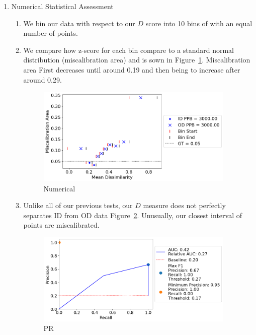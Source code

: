 \begin{enumerate}
    \item Numerical Statistical Assessment
    
    \begin{enumerate}
        \item We bin our data with respect to our $D$ score into 10 bins of with an equal number of points.

        \item We compare how z-score for each bin compare to a standard normal distribution (miscalibration area) and is sown in Figure~\ref{friedman_stat}. Miscalibration area First decreases until around 0.19 and then being to increase after around 0.29. 

        \begin{figure}[H]
        \centering
        \includegraphics[width=0.95\textwidth]{figures/friedman_stat.png}
        \caption{Numerical}
        \label{friedman_stat}
        \end{figure}

        \item Unlike all of our previous tests, our $D$ measure does not perfectly separates ID from OD data Figure~\ref{friedman_stat_pr}. Unusually, our closest interval of points are miscalibrated.

        \begin{figure}[H]
        \centering
        \includegraphics[width=0.95\textwidth]{figures/friedman_stat_pr.png}
        \caption{PR}
        \label{friedman_stat_pr}
        \end{figure}
        

\end{enumerate}
\end{enumerate}
